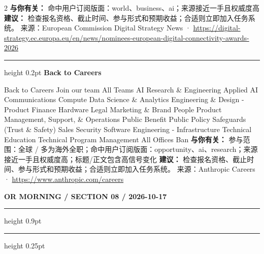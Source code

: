\documentclass[10.5pt]{ctexart}
\begin{document}
\begin{multicols}{2}
\textbf{与你有关：} 命中用户订阅版面：world、business、ai；来源接近一手且权威度高
\textbf{建议：} 检查报名资格、截止时间、参与形式和预期收益；合适则立即加入任务系统。
{\footnotesize\color{ormuted} 来源：European Commission Digital Strategy News · \url{https://digital-strategy.ec.europa.eu/en/news/nominees-european-digital-connectivity-awards-2026}}
\vspace{2mm}
\hrule height 0.2pt
\vspace{2mm}
{\large\bfseries Back to Careers}\par
Back to Careers Join our team All Teams AI Research \& Engineering Applied AI Communications Compute Data Science \& Analytics Engineering \& Design - Product Finance Hardware Legal Marketing \& Brand People Product Management, Support, \& Operations Public Benefit Public Policy Safeguards (Trust \& Safety) Sales Security Software Engineering - Infrastructure Technical Education Technical Program Management All Offices Ban
\textbf{与你有关：} 参与范围：全球 / 多为海外全职；命中用户订阅版面：opportunity、ai、research；来源接近一手且权威度高；标题/正文包含高信号变化
\textbf{建议：} 检查报名资格、截止时间、参与形式和预期收益；合适则立即加入任务系统。
{\footnotesize\color{ormuted} 来源：Anthropic Careers · \url{https://www.anthropic.com/careers}}
\end{multicols}
\newpage
{\small\bfseries OR MORNING / SECTION 08 / 2026-10-17}
\vspace{2mm}
\hrule height 0.9pt
\vspace{1.5mm}
\hrule height 0.25pt
\vspace{4mm}
\end{document}

